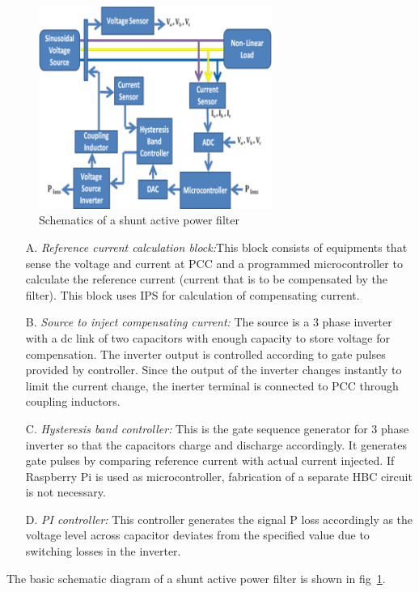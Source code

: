 \documentclass[journal,twoside]{IEEEtran}
\begin{document}
\begin{figure}[!ht]
\centering
\includegraphics[width=3in]{1}
\caption{Schematics of a shunt active power filter}
\label{f1}
\end{figure}
\begin{itemize}
\item[A.] \emph{Reference current calculation block:}This block
consists of equipments that sense the voltage and
current at PCC and a programmed microcontroller to
calculate the reference current (current that is to be
compensated by the filter). This block uses IPS for
calculation of compensating current.
\item[B.]\emph{Source to inject compensating current: }The source is
a 3 phase inverter with a dc link of two capacitors
with enough capacity to store voltage for
compensation. The inverter output is controlled
according to gate pulses provided by controller. Since
the output of the inverter changes instantly to limit
the current change, the inerter terminal is connected
to PCC through coupling inductors.
\item[C.]\emph{Hysteresis band controller:} This is the gate sequence
generator for 3 phase inverter so that the capacitors
charge and discharge accordingly. It generates gate
pulses by comparing reference current with actual
current injected. If Raspberry Pi is used as
microcontroller, fabrication of a separate HBC circuit
is not necessary.
\item[D.]\emph{PI controller:} This controller generates the signal
P loss accordingly as the voltage level across capacitor
deviates from the specified value due to switching
losses in the inverter.
\end{itemize}

The basic schematic diagram of a shunt active power
filter is shown in fig~\ref{f1}.


\newpage
\end{document}
